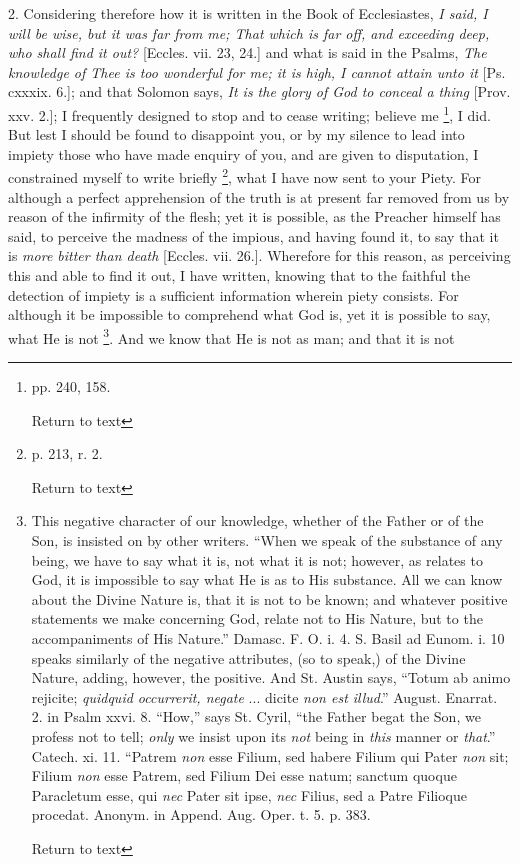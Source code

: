 2. Considering therefore how it is written in the
Book of Ecclesiastes, \emph{I said, I will be wise, but it was far from
me; That which is far off, and exceeding deep, who shall find it out?}
[Eccles. vii. 23, 24.] and what is said in the Psalms, \emph{The
knowledge of Thee is too wonderful for me; it is high, I cannot attain
unto it} [Ps. cxxxix. 6.]; and that Solomon says, \emph{It is the
glory of God to conceal a thing} [Prov. xxv. 2.]; I frequently
designed to stop and to cease writing; believe me \footnote{pp. 240, 158.

Return to text}, I did. But lest I should be found to disappoint you, or by my
silence to lead into impiety those who have made enquiry of you, and
are given to disputation, I constrained myself to write briefly \footnote{p. 213, r. 2.

Return to text}, what I have now sent to your Piety. For although a perfect
apprehension of the truth is at present far removed from us by reason
of the infirmity of the flesh; yet it is possible, as the Preacher
himself has said, to perceive the madness of the impious, and having
found it, to say that it is \emph{more bitter than death} [Eccles.
vii. 26.]. Wherefore for this reason, as perceiving this and able to
find it out, I have written, knowing that to the faithful the
detection of impiety is a sufficient information wherein piety
consists. For although it be impossible to comprehend what God is, yet
it is possible to say, what He is not \footnote{This negative character of our knowledge,
whether of the Father or of the Son, is insisted on by other writers.
“When we speak of the substance of any being, we have to say what it
is, not what it is not; however, as relates to God, it is impossible
to say what He is as to His substance. All we can know about the
Divine Nature is, that it is not to be known; and whatever positive
statements we make concerning God, relate not to His Nature, but to
the accompaniments of His Nature.” Damasc. F. O. i. 4. S. Basil ad
Eunom. i. 10 speaks similarly of the negative attributes, (so to
speak,) of the Divine Nature, adding, however, the positive. And St.
Austin says, “Totum ab animo rejicite; \emph{quidquid occurrerit,
negate} ... dicite \emph{non est illud}.” August. Enarrat. 2. in
Psalm xxvi. 8. “How,” says St. Cyril, “the Father begat the Son,
we profess not to tell; \emph{only} we insist upon its \emph{not}
being in \emph{this} manner or \emph{that}.” Catech. xi. 11.
“Patrem \emph{non} esse Filium, sed habere Filium qui Pater \emph{non}
sit; Filium \emph{non} esse Patrem, sed Filium Dei esse natum; sanctum
quoque Paracletum esse, qui \emph{nec} Pater sit ipse, \emph{nec}
Filius, sed a Patre Filioque procedat. Anonym. in Append. Aug. Oper.
t. 5. p. 383.

Return to text}. And we know that He is not as man; and that it is not
